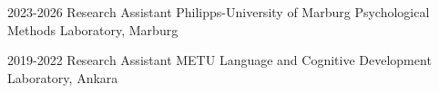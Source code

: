 

\begin{cvskills}

\cvskill
    {2023-2026} %
    {Research Assistant} %
    {Philipps-University of Marburg Psychological Methods Laboratory, Marburg}
    {}


  \cvskill
    {2019-2022} %
    {Research Assistant} %
    {METU Language and Cognitive Development Laboratory, Ankara}
    {}
    


\end{cvskills}
